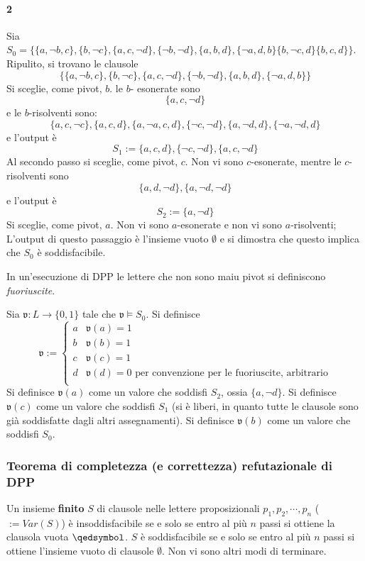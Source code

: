 \paragraph{2}
Sia $S_0 = \{\{a, \neg b, c\}, \{b, \neg c\}, \{a,c,\neg d\}, \{\neg b, \neg d\}, \{a,b,d\}, \{\neg a, d,b\} \{b, \neg c, d\}\{b, c, d\}\}$. 
Ripulito, si trovano le clausole 
$$ 
\{\{a, \neg b, c\}, \{b, \neg c\}, \{a,c,\neg d\}, \{\neg b, \neg d\}, \{a,b,d\}, \{\neg a, d,b\}\}
$$
Si sceglie, come pivot, $b$. 
le $b$- esonerate sono
$$
\{a, c, \neg d\}
$$
e le $b$-risolventi sono: 
$$
\{a, c, \neg c\}, \{a,c,d\}, \{a, \neg a, c, d\}, \{\neg c, \neg d\}, \{a, \neg d, d\}, \{\neg a, \neg d, d\}
$$
e l'output è 
$$
S_1 := \{a, c,d\}, \{\neg c, \neg d\}, \{a, c, \neg d\}
$$
Al secondo passo si sceglie, come pivot, $c$. 
Non vi sono $c$-esonerate, mentre 
le $c$-risolventi sono 
$$
\{a, d, \neg d\}, \{a, \neg d, \neg d\}
$$
e l'output è 
$$
S_2 := \{a, \neg d\}
$$
Si sceglie, come pivot, $a$. 
Non vi sono $a$-esonerate e non vi sono $a$-risolventi; 
L'output di questo passaggio è l'insieme vuoto $\emptyset$ e si dimostra 
che questo implica che $S_0$ è soddisfacibile.

\begin{defi}
        In un'esecuzione di DPP le lettere che non sono maiu pivot si 
        definiscono \textit{fuoriuscite}.
\end{defi}
Sia $\mathfrak{v}: L \rightarrow \{0,1\}$ tale che $\mathfrak{v} \models S_0$. 
Si definisce
$$
\mathfrak{v} := 
\begin{cases}
        a & \mathfrak{v}(a) = 1\\
        b & \mathfrak{v}(b) = 1\\
        c & \mathfrak{v}(c) = 1\\
        d & \mathfrak{v}(d) = 0 \text{ per convenzione per le fuoriuscite, arbitrario}\\
\end{cases}
$$
Si definisce $\mathfrak{v}(a)$ come un valore che soddisfi $S_2$, ossia $\{a, \neg d\}$.
Si definisce $\mathfrak{v}(c)$ come un valore che soddisfi $S_1$ (si è liberi, in 
quanto tutte le clausole sono già soddisfatte dagli altri assegnamenti). 
Si definisce $\mathfrak{v}(b)$ come un valore che soddisfi $S_0$.

\subsubsection{Teorema di completezza (e correttezza) refutazionale di DPP}
\begin{teo}
        Un insieme \textbf{finito} $S$ di clausole nelle lettere proposizionali 
        $p_1, p_2, \cdots, p_n$ ($:= Var(S)$) è insoddisfacibile se e solo se 
        entro al più $n$ passi si ottiene la clausola vuota $\qedsymbol$. 
        $S$ è soddisfacibile se e solo se entro al più $n$ passi si ottiene 
        l'insieme vuoto di clausole $\emptyset$.
        Non vi sono altri modi di terminare. 
\end{teo}

